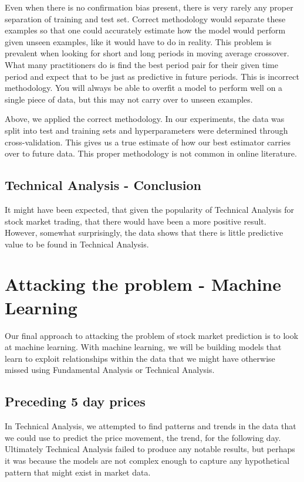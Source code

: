 \documentclass{report}
\begin{document}
Even when there is no confirmation bias present, there is very rarely any proper separation of training and test set. Correct methodology would separate these examples so that one could accurately estimate how the model would perform given unseen examples, like it would have to do in reality. This problem is prevalent when looking for short and long periods in moving average crossover. What many practitioners do is find the best period pair for their given time period and expect that to be just as predictive in future periods. This is incorrect methodology. You will always be able to overfit a model to perform well on a single piece of data, but this may not carry over to unseen examples.

Above, we applied the correct methodology. In our experiments, the data was split into test and training sets and hyperparameters were determined through cross-validation. This gives us a true estimate of how our best estimator carries over to future data. This proper methodology is not common in online literature.

\section{Technical Analysis - Conclusion}

It might have been expected, that given the popularity of Technical Analysis for stock market trading, that there would have been a more positive result. However, somewhat surprisingly, the data shows that there is little predictive value to be found in Technical Analysis. 

\chapter{Attacking the problem - Machine Learning}

Our final approach to attacking the problem of stock market prediction is to look at machine learning. With machine learning, we will be building models that learn to exploit relationships within the data that we might have otherwise missed using Fundamental Analysis or Technical Analysis.

\section{Preceding 5 day prices}

In Technical Analysis, we attempted to find patterns and trends in the data that we could use to predict the price movement, the trend, for the following day. Ultimately Technical Analysis failed to produce any notable results, but perhaps it was because the models are not complex enough to capture any hypothetical pattern that might exist in market data.
\end{document}
